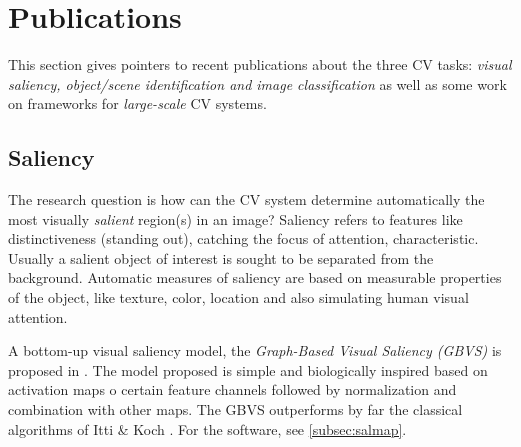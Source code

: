 \section{Publications}
\label{sec:pubs}

This section gives pointers to recent publications about the three CV tasks:  {\em visual saliency, object/scene identification and image classification} as well as some work on frameworks for {\em large-scale} CV systems.

\subsection{Saliency}

The research question is how can the CV system determine automatically the most visually {\em salient} region(s) in an image? Saliency refers to features like distinctiveness (standing out), catching the focus of attention, characteristic. Usually a salient object of interest is sought to be separated from the background. Automatic measures of saliency are based on measurable properties of the object,
like texture, color, location and also simulating human visual attention.

A bottom-up visual saliency model, the {\em Graph-Based Visual Saliency (GBVS)} is proposed in \cite{Harel07graph-basedvisual}. The model proposed is simple and biologically inspired based on activation maps o certain feature channels followed by normalization and combination with other maps. The GBVS outperforms by far the classical algorithms of Itti \& Koch \cite{Itti_Koch01nrn}. For the software, see \ref{subsec:salmap}.

